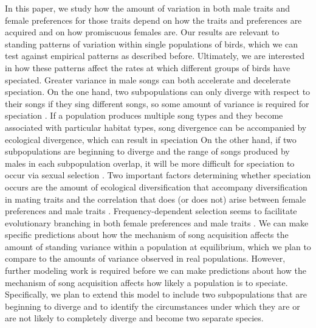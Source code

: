 \documentclass[12pt]{article}
\begin{document}
 
In this paper, we study how the amount of variation in both male traits and female preferences for those traits depend on how the traits and preferences are acquired and on how promiscuous females are. Our results are relevant to standing patterns of variation within single populations of birds, which we can test against empirical patterns as described before. Ultimately, we are interested in how these patterns affect the rates at which different groups of birds have speciated. Greater variance in male songs can both accelerate and decelerate speciation. On the one hand, two subpopulations can only diverge with respect to their songs if they sing different songs, so some amount of variance is required for speciation \cite{Mead:2004uq,Slabbekoorn:2002kl}. If a population produces multiple song types and they become associated with particular habitat types, song divergence can be accompanied by ecological divergence, which can result in speciation \cite{Slabbekoorn:2002kl,Doorn:2000nx}
On the other hand, if two subpopulations are beginning to diverge and the range of songs produced by males in each subpopulation overlap, it will be more difficult for speciation to occur via sexual selection \cite{Verzijden:2012uq,Olofsson:2011kx,Kirkpatrick:2002fu,Irwin:1999fk}. Two important factors determining whether speciation occurs are the amount of ecological diversification that accompany diversification in mating traits and the correlation that does (or does not) arise between female preferences and male traits \cite{Doorn:2000nx,Doebeli:2000oq,Verzijden:2012uq}.  Frequency-dependent selection seems to facilitate evolutionary branching in both female preferences and male traits \cite{van-Doorn:2004tg,Weissing:2011hc}. We can make specific predictions about how the mechanism of song acquisition affects the amount of standing variance within a population at equilibrium, which we plan to compare to the amounts of variance observed in real populations. However, further modeling work is required before we can make predictions about how the mechanism of song acquisition affects how likely a population is to speciate. Specifically, we plan to extend this model to include two subpopulations that are beginning to diverge and to identify the circumstances under which they are or are not likely to completely diverge and become two separate species.
\end{document}
